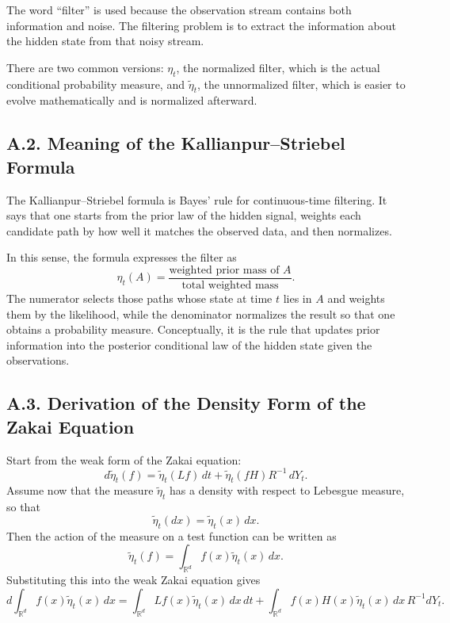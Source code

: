 \documentclass[11pt]{article}
\theoremstyle{definition}
\theoremstyle{remark}
\begin{document}
The word ``filter'' is used because the observation stream contains both information and noise. The filtering problem is to extract the information about the hidden state from that noisy stream.

There are two common versions: $\eta_t$, the normalized filter, which is the actual conditional probability measure, and $\tilde \eta_t$, the unnormalized filter, which is easier to evolve mathematically and is normalized afterward.

\subsection*{A.2. Meaning of the Kallianpur--Striebel Formula}
The Kallianpur--Striebel formula is Bayes' rule for continuous-time filtering. It says that one starts from the prior law of the hidden signal, weights each candidate path by how well it matches the observed data, and then normalizes.

In this sense, the formula expresses the filter as
\[
\eta_t(A)
=
\frac{\text{weighted prior mass of }A}{\text{total weighted mass}}.
\]
The numerator selects those paths whose state at time $t$ lies in $A$ and weights them by the likelihood, while the denominator normalizes the result so that one obtains a probability measure. Conceptually, it is the rule that updates prior information into the posterior conditional law of the hidden state given the observations.

\subsection*{A.3. Derivation of the Density Form of the Zakai Equation}
Start from the weak form of the Zakai equation:
\[
d\tilde \eta_t(f)=\tilde \eta_t(Lf)\,dt+\tilde \eta_t(fH)R^{-1}\,dY_t.
\]
Assume now that the measure $\tilde \eta_t$ has a density with respect to Lebesgue measure, so that
\[
\tilde \eta_t(dx)=\tilde \eta_t(x)\,dx.
\]
Then the action of the measure on a test function can be written as
\[
\tilde \eta_t(f)=\int_{\mathbb R^d} f(x)\tilde \eta_t(x)\,dx.
\]
Substituting this into the weak Zakai equation gives
\[
d\int_{\mathbb R^d} f(x)\tilde \eta_t(x)\,dx
=
\int_{\mathbb R^d} Lf(x)\tilde \eta_t(x)\,dx\,dt
+
\int_{\mathbb R^d} f(x)H(x)\tilde \eta_t(x)\,dx\,R^{-1}dY_t.
\]
\end{document}
